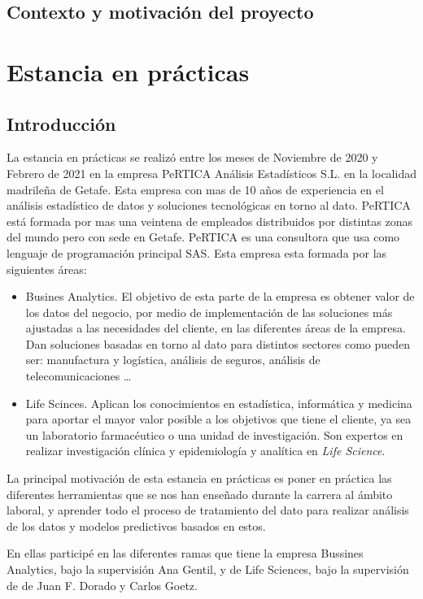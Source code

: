 \documentclass[pdftex,11pt,a4paper]{book}
\begin{document}
\section{Contexto y motivación del proyecto}




\chapter{Estancia en prácticas}

\section{Introducción}
La estancia en prácticas se realizó entre los meses de Noviembre de 2020 y Febrero de 2021 en la empresa PeRTICA Análisis Estadísticos S.L. en la localidad madrileña de Getafe.  Esta empresa con mas de 10 años de experiencia en el análisis estadístico de datos y soluciones tecnológicas en torno al dato. PeRTICA está formada por mas una veintena de empleados distribuidos por distintas zonas del mundo pero con sede en Getafe. PeRTICA es una consultora que usa como lenguaje de programación principal SAS.  Esta empresa esta formada por las siguientes áreas:
   \begin{itemize}
        \item Busines Analytics. El objetivo de esta parte de la empresa es obtener valor de los datos del negocio, por medio de implementación de las soluciones más ajustadas a las necesidades del cliente, en las diferentes áreas de la empresa. Dan soluciones  basadas en torno al dato para distintos sectores como pueden ser: manufactura y logística, análisis de seguros, análisis de telecomunicaciones \ldots

        \item Life Scinces. Aplican los conocimientos en estadística, informática y medicina para aportar el mayor valor posible a los objetivos que tiene el cliente, ya sea un laboratorio farmacéutico o una unidad de investigación. Son expertos en realizar 
        investigación clínica y epidemiología y analítica en \textit{Life Science}.
    \end{itemize}
La principal motivación de esta estancia en prácticas es poner en práctica las diferentes herramientas que se nos han enseñado durante la carrera al ámbito laboral, y aprender todo el proceso de tratamiento del dato para realizar análisis de los datos y modelos predictivos basados en estos. 

En ellas participé en las diferentes ramas que tiene la empresa Bussines Analytics, bajo la supervisión Ana Gentil, y de Life Sciences, bajo la supervisión de  de Juan F. Dorado y Carlos Goetz.
\end{document}

